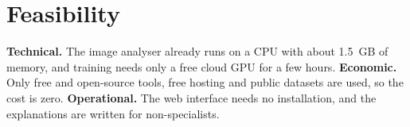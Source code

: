 \section{Feasibility}
\textbf{Technical.} The image analyser already runs on a CPU with about 1.5~GB of memory, and training needs only a free cloud GPU for a few hours. \textbf{Economic.} Only free and open-source tools, free hosting and public datasets are used, so the cost is zero. \textbf{Operational.} The web interface needs no installation, and the explanations are written for non-specialists.
